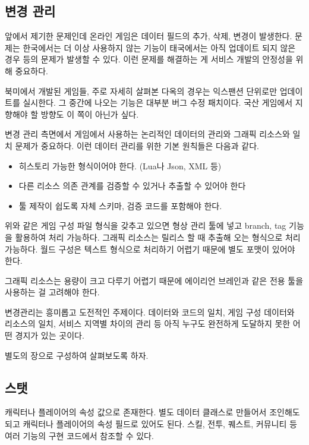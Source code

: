 \documentclass[chapter,kosection, 10.5pt, romanfixed, a4paper]{oblivoir}
\begin{document}
\subsection{변경 관리}

앞에서 제기한 문제인데 온라인 게임은 데이터 필드의 추가, 삭제, 변경이 발생한다. 문제는 한국에서는 더 이상
사용하지 않는 기능이 태국에서는 아직 업데이트 되지 않은 경우 등의 문제가 발생할 수 있다. 이런 문제를 해결하는 게 
서비스 개발의 안정성을 위해 중요하다.

북미에서 개발된 게임들, 주로 자세히 살펴본 다옥의 경우는 익스팬션 단위로만 업데이트를 실시한다. 그 중간에 
나오는 기능은 대부분 버그 수정 패치이다. 국산 게임에서 지향해야 할 방향도 이 쪽이 아닌가 싶다. 

변경 관리 측면에서 게임에서 사용하는 논리적인 데이터의 관리와 그래픽 리소스와 일치 문제가 중요하다. 이런 데이터 
관리를 위한 기본 원칙들은 다음과 같다. 
\begin{itemize}
\item 히스토리 가능한 형식이어야 한다. (Lua나 Json, XML 등)
\item 다른 리소스 의존 관계를 검증할 수 있거나 추출할 수 있어야 한다
\item 툴 제작이 쉽도록 자체 스키마, 검증 코드를 포함해야 한다. 
\end{itemize}

위와 같은 게임 구성 파일 형식을 갖추고 있으면 형상 관리 툴에 넣고 branch, tag 기능을 활용하여 처리 가능하다. 
그래픽 리소스는 릴리스 할 때 추출해 오는 형식으로 처리 가능하다. 월드 구성은 텍스트 형식으로 처리하기 어렵기 
때문에 별도 포맷이 있어야 한다. 

그래픽 리소스는 용량이 크고 다루기 어렵기 때문에 에이리언 브레인과 같은 전용 툴을 사용하는 걸 고려해야 한다. 

변경관리는 흥미롭고 도전적인 주제이다. 데이터와 코드의 일치, 게임 구성 데이터와 리소스의 일치, 서비스 지역별 
차이의 관리 등 아직 누구도 완전하게 도달하지 못한 어떤 경지가 있는 곳이다. 

별도의 장으로 구성하여 살펴보도록 하자. 

\subsection{스탯}

캐릭터나 플레이어의 속성 값으로 존재한다. 별도 데이터 클래스로 만들어서 조인해도 되고 
캐릭터나 플레이어의 속성 필드로 있어도 된다. 스킬, 전투, 퀘스트, 커뮤니티 등 여러 기능의 
구현 코드에서 참조할 수 있다. 
\end{document}
